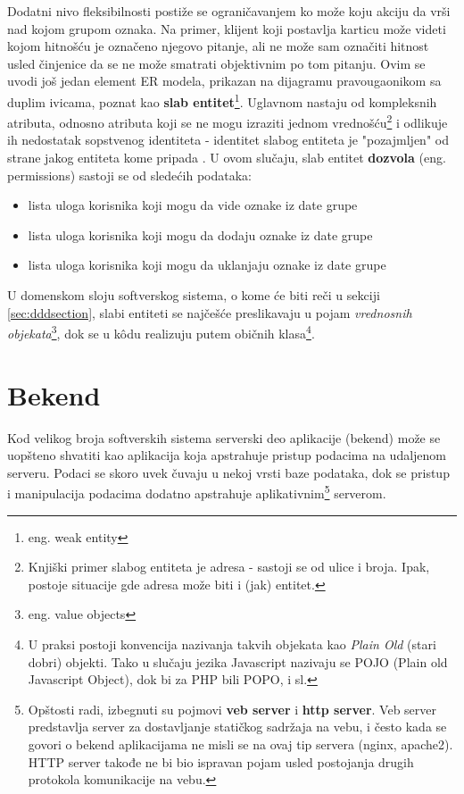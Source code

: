 \documentclass[12pt,oneside]{memoir}
\begin{document}
Dodatni nivo fleksibilnosti postiže se ograničavanjem ko može koju akciju da vrši nad kojom grupom oznaka. Na primer, klijent koji postavlja karticu može videti kojom hitnošću je označeno njegovo pitanje, ali ne može sam označiti hitnost usled činjenice da se ne može smatrati objektivnim po tom pitanju. Ovim se uvodi još jedan element ER modela, prikazan na dijagramu pravougaonikom sa duplim ivicama, poznat kao \textbf{slab entitet}\footnote{eng. weak entity}. Uglavnom nastaju od kompleksnih atributa, odnosno atributa koji se ne mogu izraziti jednom vrednošću\footnote{Knjiški primer slabog entiteta je adresa - sastoji se od ulice i broja. Ipak, postoje situacije gde adresa može biti i (jak) entitet.} i odlikuje ih nedostatak sopstvenog identiteta - identitet slabog entiteta je "pozajmljen" od strane jakog entiteta kome pripada \cite{dbmodelinganddesign}. U ovom slučaju, slab entitet \textbf{dozvola} (eng. permissions) sastoji se od sledećih podataka:
\begin{itemize}
    \item lista uloga korisnika koji mogu da vide oznake iz date grupe
    \item lista uloga korisnika koji mogu da dodaju oznake iz date grupe
    \item lista uloga korisnika koji mogu da uklanjaju oznake iz date grupe
\end{itemize}

U domenskom sloju softverskog sistema, o kome će biti reči u sekciji \ref{sec:dddsection}, slabi entiteti se najčešće preslikavaju u pojam \textit{vrednosnih objekata}\footnote{eng. value objects}, dok se u k\^{o}du realizuju putem običnih klasa\footnote{U praksi postoji konvencija nazivanja takvih objekata kao \textit{Plain Old} (stari dobri) objekti. Tako u slučaju jezika Javascript nazivaju se POJO (Plain old Javascript Object), dok bi za PHP bili POPO, i sl.}.






\chapter{Bekend}
\label{sec:backend}
Kod velikog broja softverskih sistema serverski deo aplikacije (bekend) može se uopšteno shvatiti kao aplikacija koja apstrahuje pristup podacima na udaljenom serveru. Podaci se skoro uvek čuvaju u nekoj vrsti baze podataka, dok se pristup i manipulacija podacima dodatno apstrahuje aplikativnim\footnote{Opštosti radi, izbegnuti su pojmovi \textbf{veb server} i \textbf{http server}. Veb server predstavlja server za dostavljanje statičkog sadržaja na vebu, i često kada se govori o bekend aplikacijama ne misli se na ovaj tip servera (nginx, apache2). HTTP server takođe ne bi bio ispravan pojam usled postojanja drugih protokola komunikacije na vebu.} serverom.
\end{document}
